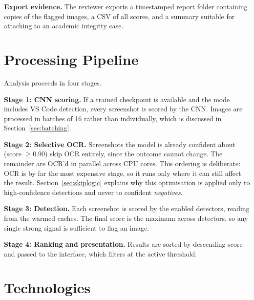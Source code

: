 \documentclass[12pt,oneside]{report}
\begin{document}
\textbf{Export evidence.} The reviewer exports a timestamped report folder
containing copies of the flagged images, a CSV of all scores, and a summary
suitable for attaching to an academic integrity case.

\section{Processing Pipeline}
\label{sec:pipeline}

Analysis proceeds in four stages.

\textbf{Stage 1: CNN scoring.} If a trained checkpoint is available and the
mode includes VS Code detection, every screenshot is scored by the CNN. Images
are processed in batches of 16 rather than individually, which is discussed in
Section~\ref{sec:batching}.

\textbf{Stage 2: Selective OCR.} Screenshots the model is already confident
about (score $\geq 0.90$) skip OCR entirely, since the outcome cannot change.
The remainder are OCR'd in parallel across CPU cores. This ordering is
deliberate: OCR is by far the most expensive stage, so it runs only where it
can still affect the result. Section~\ref{sec:skiplogic} explains why this
optimisation is applied only to high-confidence detections and never to
confident \emph{negatives}.

\textbf{Stage 3: Detection.} Each screenshot is scored by the enabled
detectors, reading from the warmed caches. The final score is the maximum
across detectors, so any single strong signal is sufficient to flag an image.

\textbf{Stage 4: Ranking and presentation.} Results are sorted by descending
score and passed to the interface, which filters at the active threshold.

\section{Technologies}
\label{sec:tech}
\end{document}
